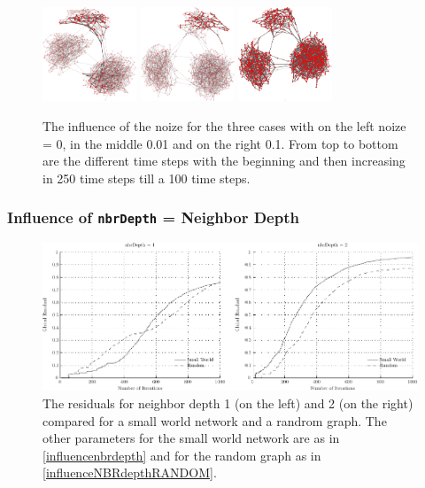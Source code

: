 \begin{figure}
\includegraphics[width=0.25\textwidth]{batchRun__kHalf=2-2-2_maxUpdate=0.02_noize=0_nbrDepth=1/network1000-crop.pdf}
\hfill
\includegraphics[width=0.25\textwidth]{batchRun__kHalf=2-2-2_maxUpdate=0.02_noize=0.01_nbrDepth=1/network1000-crop.pdf}
\hfill
\includegraphics[width=0.25\textwidth]{batchRun__kHalf=2-2-2_maxUpdate=0.02_noize=0.1_nbrDepth=1/network1000-crop.pdf}

\caption{The influence of the noize for the three cases with on the left noize = 0, in the middle 0.01 and on the right 0.1. From top to bottom are the different time steps with the beginning and then increasing in 250 time steps till a 100 time steps.}
\label{influencenoize}
\end{figure}



\subsubsection{Influence of \texttt{nbrDepth} = Neighbor Depth}
\label{sec:nbrDepth}

\begin{figure}
\centering
\includegraphics[width= \textwidth]{influenceOfNbrDepth/influenceNbrDepth.pdf}
\caption{The residuals for neighbor depth 1 (on the left) and 2 (on the right) compared for a small world network and a randrom graph. The other parameters for the small world network are as in \ref{influencenbrdepth} and for the random graph as in \ref{influenceNBRdepthRANDOM}.}
\label{residualNBRdepth}
\end{figure}

